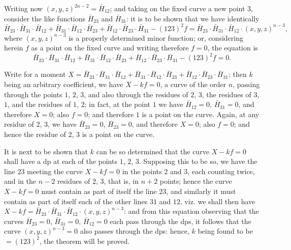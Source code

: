 \documentclass[11pt,a4paper]{book}
\begin{document}
\begin{art}\label{art:55}
Writing now $(x, y, z)^{2n-2} = \bar{H}_{12}$; and taking on the fixed curve a new point $3$, consider the like functions $\bar{H}_{23}$ and $\bar{H}_{31}$: it is to be shown that we have identically
\[
\bar{H}_{23} \cdot \bar{H}_{31} \cdot \bar{H}_{12} + \bar{H}_{31} \cdot \bar{H}_{12} \cdot \bar{H}_{23} + \bar{H}_{12} \cdot \bar{H}_{23} \cdot \bar{H}_{31} - (123)^2 f = \bar{H}_{23} \cdot \bar{H}_{31} \cdot \bar{H}_{12} \cdot (x, y, z)^{n-3},
\]
where $(x, y, z)^{n-3}$ is a properly determined minor function; or, considering herein $f$ as a point on the fixed curve and writing therefore $f = 0$, the equation is
\[
\bar{H}_{23} \cdot \bar{H}_{31} \cdot \bar{H}_{12} + \bar{H}_{31} \cdot \bar{H}_{12} \cdot \bar{H}_{23} + \bar{H}_{12} \cdot \bar{H}_{23} \cdot \bar{H}_{31} - (123)^2 f = 0.
\]
\end{art}

\begin{art}\label{art:56}
Write for a moment $X = \bar{H}_{23} \cdot \bar{H}_{31} \cdot \bar{H}_{12} + \bar{H}_{31} \cdot \bar{H}_{12} \cdot \bar{H}_{23} + \bar{H}_{12} \cdot \bar{H}_{23} \cdot \bar{H}_{31}$; then $k$ being an arbitrary coefficient, we have $X - kf = 0$, a curve of the order $n$, passing through the points $1$, $2$, $3$, and also through the residues of $2$, $3$, the residues of $3$, $1$, and the residues of $1$, $2$; in fact, at the point $1$ we have $\bar{H}_{12} = 0$, $\bar{H}_{31} = 0$, and therefore $X = 0$; also $f = 0$; and therefore $1$ is a point on the curve. Again, at any residue of $2$, $3$, we have $\bar{H}_{23} = 0$, $\bar{H}_{23} = 0$, and therefore $X = 0$; also $f = 0$; and hence the residue of $2$, $3$ is a point on the curve.

It is next to be shown that $k$ can be so determined that the curve $X - kf = 0$ shall have a dp at each of the points $1$, $2$, $3$. Supposing this to be so, we have the line $23$ meeting the curve $X - kf = 0$ in the points $2$ and $3$, each counting twice, and in the $n-2$ residues of $2$, $3$, that is, in $n + 2$ points; hence the curve $X - kf = 0$ must contain as part of itself the line $23$, and similarly it must contain as part of itself each of the other lines $31$ and $12$, viz. we shall then have $X - kf = \bar{H}_{23} \cdot \bar{H}_{31} \cdot \bar{H}_{12} \cdot (x, y, z)^{n-3}$: and from this equation observing that the curves $\bar{H}_{23} = 0$, $\bar{H}_{31} = 0$, $\bar{H}_{12} = 0$ each pass through the dps, it follows that the curve $(x, y, z)^{n-3} = 0$ also passes through the dps: hence, $k$ being found to be $= (123)^2$, the theorem will be proved.
\end{art}
\end{document}
